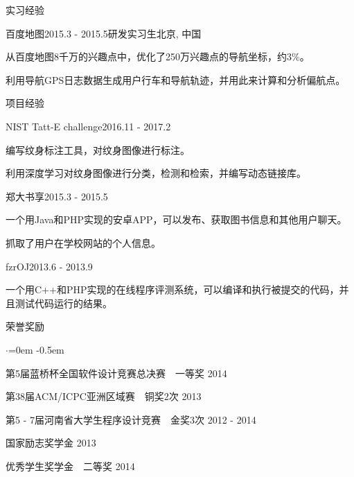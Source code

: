 \documentclass{resume} %
\begin{document}
\begin{rSection}{实习经验}
\begin{rSubsection}{百度地图}{2015.3 - 2015.5}{研发实习生}{北京, 中国}
\item 从百度地图8千万的兴趣点中，优化了250万兴趣点的导航坐标，约3\%。
\item 利用导航GPS日志数据生成用户行车和导航轨迹，并用此来计算和分析偏航点。
\end{rSubsection}
\end{rSection}




\begin{rSection}{项目经验}


\begin{rSubsection}{NIST Tatt-E challenge}{2016.11 - 2017.2}{}{}
\item 编写纹身标注工具，对纹身图像进行标注。
\item 利用深度学习对纹身图像进行分类，检测和检索，并编写动态链接库。
\end{rSubsection}


\begin{rSubsection}{郑大书享}{2015.3 - 2015.5}{}{}
\item 一个用Java和PHP实现的安卓APP，可以发布、获取图书信息和其他用户聊天。
\item 抓取了用户在学校网站的个人信息。
\end{rSubsection}

\begin{rSubsection}{fzrOJ}{2013.6 - 2013.9}{}{}
\item 一个用C++和PHP实现的在线程序评测系统，可以编译和执行被提交的代码，并且测试代码运行的结果。
\end{rSubsection}

\end{rSection}


\begin{rSection}{荣誉奖励}
\begin{list}{$\cdot$}{\leftmargin=0em}
\itemsep -0.5em \vspace{0em}
\item 第5届蓝桥杯全国软件设计竞赛总决赛~~一等奖 \hfill{2014}
\item 第38届ACM/ICPC亚洲区域赛~~铜奖2次 \hfill {2013}
\item 第5 - 7届河南省大学生程序设计竞赛~~金奖3次 \hfill {2012 - 2014}
\item 国家励志奖学金 \hfill {2013}
\item 优秀学生奖学金~~二等奖 \hfill {2014}
\end{list}
\end{rSection}
\end{document}
